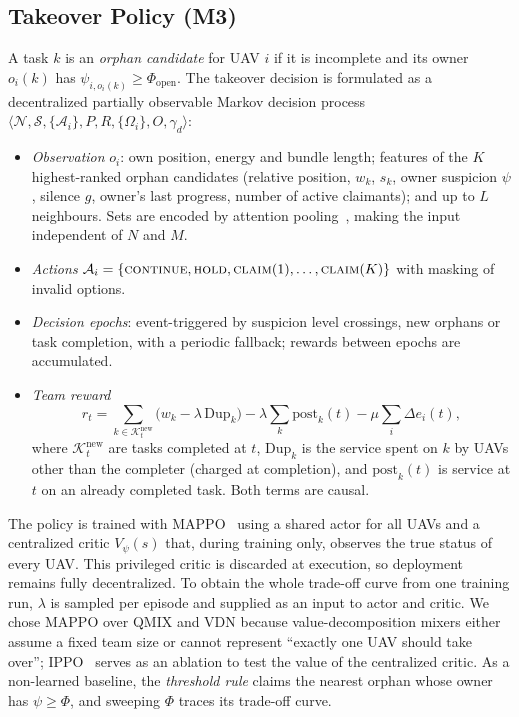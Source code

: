 \documentclass[journal]{IEEEtran}
\begin{document}
\subsection{Takeover Policy (M3)}\label{sec:policy}
A task $k$ is an \emph{orphan candidate} for UAV $i$ if it is incomplete and its owner $o_i(k)$ has $\psi_{i,o_i(k)}\ge\Phi_{\mathrm{open}}$. The takeover decision is formulated as a decentralized partially observable Markov decision process $\langle\mathcal{N},\mathcal{S},\{\mathcal{A}_i\},P,R,\{\Omega_i\},O,\gamma_d\rangle$:
\begin{itemize}
\item \emph{Observation} $o_i$: own position, energy and bundle length; features of the $K$ highest-ranked orphan candidates (relative position, $w_k$, $s_k$, owner suspicion $\psi$, silence $g$, owner's last progress, number of active claimants); and up to $L$ neighbours. Sets are encoded by attention pooling~\cite{R78_iqbal2019}, making the input independent of $N$ and $M$.
\item \emph{Actions} $\mathcal{A}_i=\{\textsc{continue},\textsc{hold},\textsc{claim}(1),\dots,\textsc{claim}(K)\}$ with masking of invalid options.
\item \emph{Decision epochs}: event-triggered by suspicion level crossings, new orphans or task completion, with a periodic fallback; rewards between epochs are accumulated.
\item \emph{Team reward}
\begin{equation}
r_t=\sum_{k\in\mathcal{K}_t^{\mathrm{new}}}\big(w_k-\lambda\,\mathrm{Dup}_k\big)-\lambda\sum_{k}\mathrm{post}_k(t)-\mu\sum_i\Delta e_i(t),\label{eq:reward}
\end{equation}
where $\mathcal{K}_t^{\mathrm{new}}$ are tasks completed at $t$, $\mathrm{Dup}_k$ is the service spent on $k$ by UAVs other than the completer (charged at completion), and $\mathrm{post}_k(t)$ is service at $t$ on an already completed task. Both terms are causal.
\end{itemize}

The policy is trained with MAPPO~\cite{R62_yu2022} using a shared actor for all UAVs and a centralized critic $V_\psi(s)$ that, during training only, observes the true status of every UAV. This privileged critic is discarded at execution, so deployment remains fully decentralized. To obtain the whole trade-off curve from one training run, $\lambda$ is sampled per episode and supplied as an input to actor and critic. We chose MAPPO over QMIX and VDN because value-decomposition mixers either assume a fixed team size or cannot represent ``exactly one UAV should take over''; IPPO~\cite{R76_witt2020} serves as an ablation to test the value of the centralized critic. As a non-learned baseline, the \emph{threshold rule} claims the nearest orphan whose owner has $\psi\ge\Phi$, and sweeping $\Phi$ traces its trade-off curve.
\end{document}
